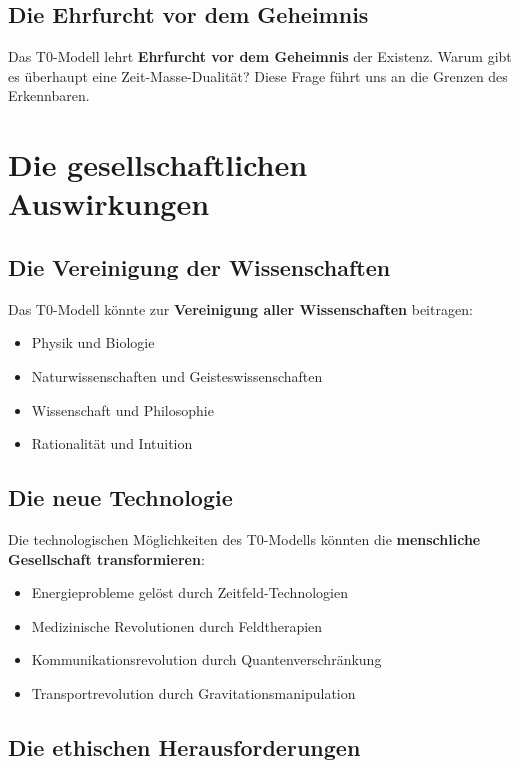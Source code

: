 \documentclass[12pt,a4paper]{report}
\begin{document}
	\subsection{Die Ehrfurcht vor dem Geheimnis}
	
	Das T0-Modell lehrt \textbf{Ehrfurcht vor dem Geheimnis} der Existenz. Warum gibt es überhaupt eine Zeit-Masse-Dualität? Diese Frage führt uns an die Grenzen des Erkennbaren.
	
	\section{Die gesellschaftlichen Auswirkungen}
	
	\subsection{Die Vereinigung der Wissenschaften}
	
	Das T0-Modell könnte zur \textbf{Vereinigung aller Wissenschaften} beitragen:
	
	\begin{itemize}
		\item Physik und Biologie
		\item Naturwissenschaften und Geisteswissenschaften
		\item Wissenschaft und Philosophie
		\item Rationalität und Intuition
	\end{itemize}
	
	\subsection{Die neue Technologie}
	
	Die technologischen Möglichkeiten des T0-Modells könnten die \textbf{menschliche Gesellschaft transformieren}:
	
	\begin{itemize}
		\item Energieprobleme gelöst durch Zeitfeld-Technologien
		\item Medizinische Revolutionen durch Feldtherapien
		\item Kommunikationsrevolution durch Quantenverschränkung
		\item Transportrevolution durch Gravitationsmanipulation
	\end{itemize}
	
	\subsection{Die ethischen Herausforderungen}
	
\end{document}
